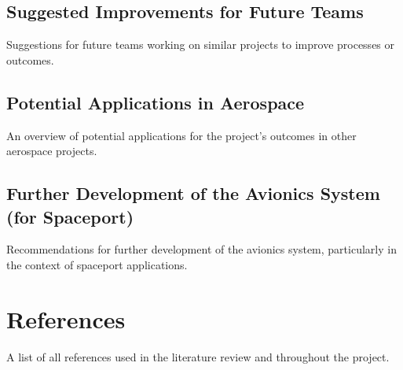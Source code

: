 \subsection{Suggested Improvements for Future Teams}
Suggestions for future teams working on similar projects to improve processes or outcomes.

\subsection{Potential Applications in Aerospace}
An overview of potential applications for the project's outcomes in other aerospace projects.

\subsection{Further Development of the Avionics System (for Spaceport)}
Recommendations for further development of the avionics system, particularly in the context of spaceport applications.

\section{References}
A list of all references used in the literature review and throughout the project.
